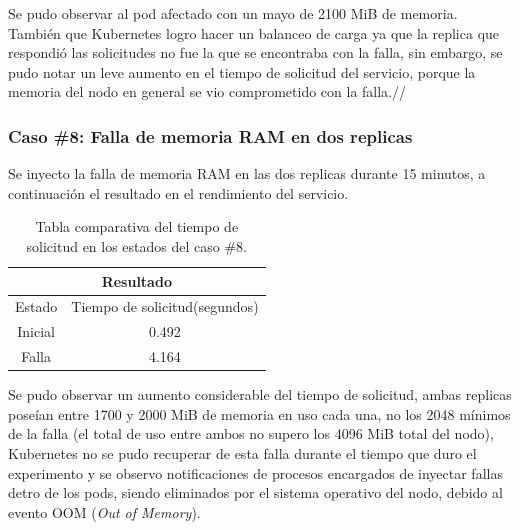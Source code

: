 \par Se pudo observar al pod afectado con un mayo de 2100 MiB de memoria. También que Kubernetes logro hacer un balanceo de carga ya que la replica que respondió las solicitudes no fue la que se encontraba con la falla, sin embargo, se pudo notar un leve aumento en el tiempo de solicitud del servicio, porque la memoria del nodo en general se vio comprometido con la falla.//

\subsubsection{Caso \#8: Falla de memoria RAM en dos replicas}

\par Se inyecto la falla de memoria RAM en las dos replicas durante 15 minutos, a continuación el resultado en el rendimiento del servicio.\\

\begin{table}[ht!]
\begin{center}
\begin{tabular}{ |c|c| } 
 \hline
 \multicolumn{2}{|c|}{Resultado} \\
 \hline
 \hline
 Estado & Tiempo de solicitud(segundos)\\
 \hline
 Inicial & 0.492\\
 Falla & 4.164\\
 \hline
\end{tabular}
\end{center}
\caption{Tabla comparativa del tiempo de solicitud en los estados del caso \#8.}
\label{tab:tabla52}
\end{table}

\par Se pudo observar un aumento considerable del tiempo de solicitud, ambas replicas poseían entre 1700 y 2000 MiB de memoria en uso cada una, no los 2048 mínimos de la falla (el total de uso entre ambos no supero los 4096 MiB total del nodo), Kubernetes no se pudo recuperar de esta falla durante el tiempo que duro el experimento y se observo notificaciones de procesos encargados de inyectar fallas detro de los pods, siendo eliminados por el sistema operativo del nodo, debido al evento OOM (\textit{Out of Memory}).\\
